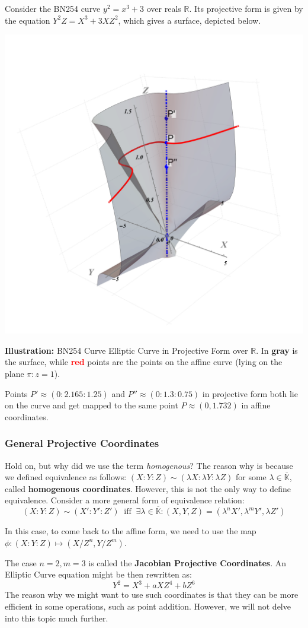 \documentclass[../lecture-notes.tex]{subfiles}
\begin{document}
\begin{example}
    Consider the BN254 curve $y^2 = x^3 + 3$ over reals $\mathbb{R}$. Its projective form is given by the equation $Y^2Z = X^3 + 3XZ^2$, which gives a surface, depicted below.
    \begin{center}
        \includegraphics[trim={275 100 225 100}, width=0.35\linewidth, clip]{images/lecture_4/projective_ec.pdf}
        
        \scriptsize{\textbf{Illustration:} BN254 Curve Elliptic Curve in Projective Form over $\mathbb{R}$. In \textcolor{black!80}{\textbf{gray}} is the surface, while \textcolor{red}{\textbf{red}} points are the points on the affine curve (lying on the plane $\pi: z=1$).}
    \end{center}

    Points $P'\approx (0:2.165:1.25)$ and $P'' \approx (0:1.3:0.75)$ in projective form both lie on the curve and get mapped to the same point $P \approx (0,1.732)$ in affine coordinates.
\end{example}

\subsubsection{General Projective Coordinates}
Hold on, but why did we use the term \textit{homogenous}? The reason why is because we defined equivalence as follows: $(X:Y:Z) \sim (\lambda X: \lambda Y: \lambda Z)$ for some $\lambda \in \overline{\mathbb{K}}$, called \textbf{homogenous coordinates}. However, this is not the only way to define equivalence. Consider a more general form of equivalence relation:
\begin{equation}
    (X:Y:Z) \sim (X':Y':Z') \;\; \text{iff} \;\; \exists \lambda \in \overline{\mathbb{K}}: (X,Y,Z) = (\lambda^n X', \lambda^m Y', \lambda Z')
\end{equation}

In this case, to come back to the affine form, we need to use the map $\phi: (X:Y:Z) \mapsto (X/Z^n, Y/Z^m)$. 
\begin{example}
    The case $n=2,m=3$ is called the \textbf{Jacobian Projective Coordinates}. An Elliptic Curve equation might be then rewritten as: 
    \begin{equation}
        Y^2 = X^3 + aXZ^4 + bZ^6
    \end{equation}
    The reason why we might want to use such coordinates is that they can be more efficient in some operations, such as point addition. However, we will not delve into this topic much further.
\end{example}
\end{document}
